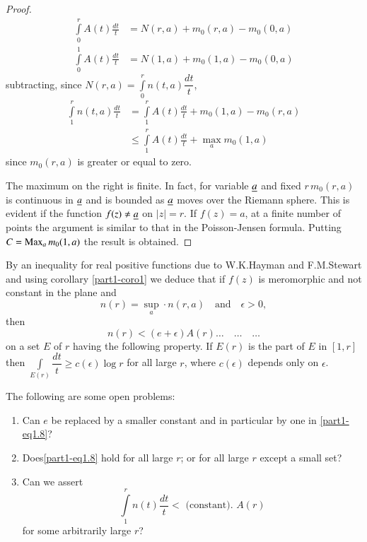 \begin{proof}
\begin{align*}
\int\limits^{r}_{0}A(t)\frac{dt}{t} &=N(r,a)+m_{0}(r,a)-m_{0}(0,a)\\
\int\limits^{1}_{0}A(t)\frac{dt}{t} &= N(1,a)+m_{0}(1,a)-m_{0}(0,a)
\end{align*}
subtracting, since $N(r,a)=\int\limits^{r}_{0}n(t,a)\dfrac{dt}{t}$, 
\begin{align*}
\int\limits^{r}_{1}n(t,a)\frac{dt}{t} &=\int\limits^{r}_{1}A(t)\frac{dt}{t}+m_{0}(1,a)-m_{0}(r,a)\\
&\leq \int\limits^{r}_{1}A(t)\frac{dt}{t}+\max\limits_{a}m_{0}(1,a)
\end{align*}\pageoriginale
since $m_{0}(r,a)$ is greater or equal to zero.

The maximum on the right is finite. In fact, for variable $\underline{a}$ and
fixed $r\,m_{0}(r,a)$ is continuous in $\underline{a}$ and is bounded as
$\underline{a}$ moves over the Riemann sphere. This is evident if the
function $f(z)\neq \underline{a}$ on $|z|=r$. If $f(z)=a$, at a finite number
of points the argument is similar to that in the Poisson-Jensen
formula. Putting $C=\operatorname{Max}\limits_{a}m_{0}(1,a)$ the result is obtained.
\end{proof}

\begin{remark*}
By an inequality for real positive functions due to W.K.\@ Hayman and
F.M.\@ Stewart \cite{1} and using corollary \ref{part1-coro1} we
deduce that if $f(z)$ is meromorphic and not constant in the plane and
$$
n(r)=\sup\limits_{a}\cdot n(r,a)\quad\text{and}\quad \epsilon>0,
$$
then
\begin{equation*}
n(r)<(e+\epsilon)A(r)\ldots\quad
\ldots\quad\ldots\tag{1.8}\label{part1-eq1.8} 
\end{equation*}
on a set $E$ of $r$ having the following property. If $E(r)$ is the
part of $E$ in $[1,r]$ then $\int\limits_{E(r)}\dfrac{dt}{t}\geq
c(\epsilon)\log r$ for all large $r$, where $c(\epsilon)$ depends only
on $\epsilon$.
\end{remark*}

The following are some open problems:
\begin{enumerate}
\renewcommand{\theenumi}{\alph{enumi}}
\renewcommand{\labelenumi}{(\theenumi)}
\item Can $e$ be replaced by a smaller constant and in particular by
  one in \eqref{part1-eq1.8}?

\item Does\pageoriginale \eqref{part1-eq1.8} hold for all large $r$;
  or for all large $r$ except a small set?

\item Can we assert
$$
\int\limits^{r}_{1}n(t)\frac{dt}{t}<\text{ (constant). } A(r)
$$
for some arbitrarily large $r$?
\end{enumerate}

